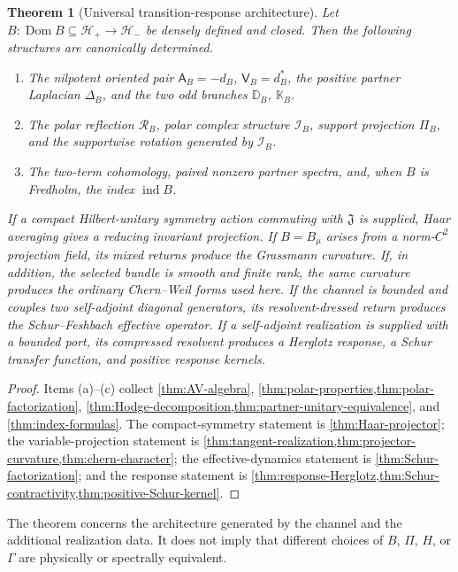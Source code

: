 \documentclass[11pt,reqno]{scrartcl}
\newcommand{\scrHp}{\mathscr H_{+}}
\newcommand{\scrHm}{\mathscr H_{-}}
\newcommand{\fundJ}{\mathfrak J}
\newcommand{\Aop}{\mathsf A}
\newcommand{\Vop}{\mathsf V}
\newcommand{\DB}{\mathbb D}
\newcommand{\KB}{\mathbb K}
\newcommand{\DeltaB}{\Delta}
\DeclareMathOperator{\Dom}{Dom}
\DeclareMathOperator{\ind}{ind}
\newcommand{\SuppB}{\Pi_B}
\newcommand{\RB}{\mathcal R_B}
\newcommand{\IB}{\mathcal I_B}
\theoremstyle{plain}
\newtheorem{theorem}{Theorem}[section]
\theoremstyle{definition}
\theoremstyle{remark}
\begin{document}
\begin{theorem}[Universal transition-response architecture]
\label{thm:architecture}
Let \(B:\Dom B\subseteq\scrHp\to\scrHm\) be densely defined and closed.
Then the following structures are canonically determined.
\begin{enumerate}[label=(\alph*)]
  \item The nilpotent oriented pair \(\Aop_B=-d_B\),
  \(\Vop_B=d_B^*\), the positive partner Laplacian
  \(\DeltaB_B\), and the two odd branches \(\DB_B\), \(\KB_B\).
  \item The polar reflection \(\RB\), polar complex structure \(\IB\),
  support projection \(\SuppB\), and the supportwise rotation generated by
  \(\IB\).
  \item The two-term cohomology, paired nonzero partner spectra, and, when
  \(B\) is Fredholm, the index \(\ind B\).
\end{enumerate}
If a compact Hilbert-unitary symmetry action commuting with \(\fundJ\) is
supplied, Haar averaging gives a reducing invariant projection.  If
\(B=B_\mu\) arises from a norm-\(C^2\) projection field, its mixed returns
produce the Grassmann curvature.  If, in addition, the selected bundle is
smooth and finite rank, the same curvature produces the ordinary
Chern--Weil forms used here.  If the channel is
bounded and couples two self-adjoint diagonal generators, its
resolvent-dressed return produces the Schur--Feshbach effective operator.  If a self-adjoint realization is supplied
with a bounded port, its compressed resolvent produces a Herglotz response, a
Schur transfer function, and positive response kernels.
\end{theorem}

\begin{proof}
Items (a)--(c) collect
\cref{thm:AV-algebra},
\cref{thm:polar-properties,thm:polar-factorization},
\cref{thm:Hodge-decomposition,thm:partner-unitary-equivalence}, and
\cref{thm:index-formulas}.
The compact-symmetry statement is \cref{thm:Haar-projector}; the
variable-projection statement is
\cref{thm:tangent-realization,thm:projector-curvature,thm:chern-character};
the effective-dynamics statement is \cref{thm:Schur-factorization}; and the
response statement is
\cref{thm:response-Herglotz,thm:Schur-contractivity,thm:positive-Schur-kernel}.
\end{proof}

The theorem concerns the architecture generated by the channel and the
additional realization data.  It does not imply that different choices of
\(B\), \(\Pi\), \(H\), or \(\Gamma\) are physically or spectrally
equivalent.
\end{document}
